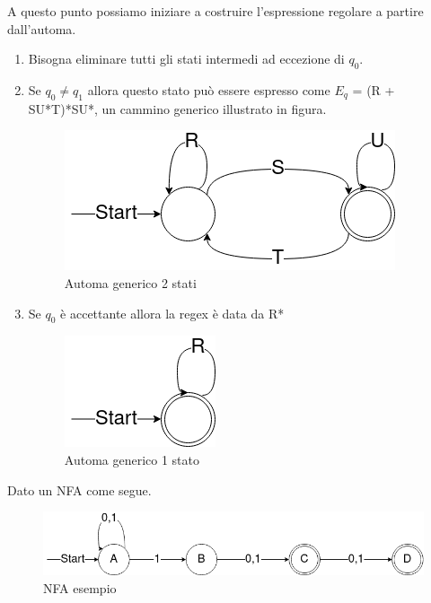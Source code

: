 \documentclass[12pt]{article}
\begin{document}
	A questo punto possiamo iniziare a costruire l'espressione regolare a partire dall'automa.
	\newpage
	\begin{enumerate}
		\item Bisogna eliminare tutti gli stati intermedi ad eccezione di $q_0$.
		\item Se $q_0\neq q_1$ allora questo stato può essere espresso come $E_q$ = (R + SU*T)*SU*, un cammino generico illustrato in figura.

		      \begin{figure}[ht]
			      \includegraphics[scale = 0.5]{media/automa_generico.png}
			      \centering
			      \caption{Automa generico 2 stati}
		      \end{figure}

		\item Se $q_0$ è accettante allora la regex è data da R*

		      \begin{figure}[ht]
			      \includegraphics[scale = 0.5]{media/automa_q0.png}
			      \centering
			      \caption{Automa generico 1 stato}
		      \end{figure}

	\end{enumerate}

	\newpage
	Dato un NFA come segue.

	\begin{figure}[ht]
		\includegraphics[scale = 0.5]{media/dfa_s1.png}
		\centering
		\caption{NFA esempio}
	\end{figure}
\end{document}

